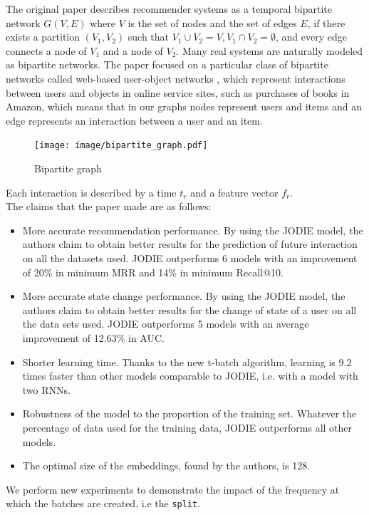 The original paper describes recommender systems as a temporal bipartite network { \color{blue} $G(V, E)$  where $V$ is the set of nodes and the set of edges $E$, if there exists a partition $\left(V_1, V_2\right)$ such that $V_1 \cup V_2=V, V_1 \cap V_2=\emptyset$, and every edge connects a node of $V_1$ and a node of $V_2$. Many real systems are naturally modeled as bipartite networks. The paper focused on a particular class of bipartite networks called web-based user-object networks \supercite{Shang_2010}, which represent interactions between users and objects in online service sites, such as purchases of books in Amazon, which means that in our graphs  nodes  represent users and items and an edge  represents an interaction between a user and an item.}

\begin{figure}[H]
    \centering
    \texttt{[image: image/bipartite\_graph.pdf]}
    \caption{Bipartite graph}
    \label{bipartite_graph}
\end{figure}
Each interaction is described by a time $t_r$ and a feature vector $f_r$.\\

The claims that the paper made are as follows:
\begin{itemize}
    \item More accurate recommendation performance. By using the JODIE model, the authors claim to obtain better results for the prediction of future interaction on all the datasets used. JODIE outperforms 6 models with an improvement of 20\% in minimum MRR and 14\% in minimum Recall@10.
    \item More accurate state change performance. By using the JODIE model, the authors claim to obtain better results for the change of state of a user on all the data sets used. JODIE outperforms 5 models with an average improvement of 12.63\% in AUC.
    \item Shorter learning time. Thanks to the new t-batch algorithm, learning is 9.2 times faster than other models comparable to JODIE, i.e. with a model with two RNNs.
    \item Robustness of the model to the proportion of the training set. Whatever the percentage of data used for the training data, JODIE outperforms all other models.
    \item The optimal size of the embeddings, found by the authors, is 128.
\end{itemize}

We perform new experiments to demonstrate the impact of the frequency at which the batches are created, i.e the \texttt{split}.
